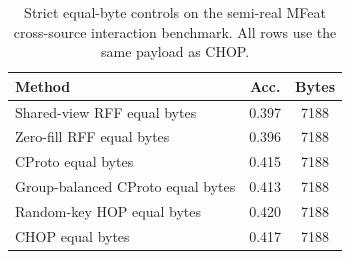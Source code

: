 \begin{table}[t]
\centering
\caption{Strict equal-byte controls on the semi-real MFeat cross-source interaction benchmark. All rows use the same payload as CHOP.}
\label{tab:strict-equal-byte-mfeat-interaction}
\begin{tabular}{lcc}
\toprule
Method & Acc. & Bytes \\
\midrule
Shared-view RFF equal bytes & 0.397 & 7188 \\
Zero-fill RFF equal bytes & 0.396 & 7188 \\
CProto equal bytes & 0.415 & 7188 \\
Group-balanced CProto equal bytes & 0.413 & 7188 \\
Random-key HOP equal bytes & 0.420 & 7188 \\
CHOP equal bytes & 0.417 & 7188 \\
\bottomrule
\end{tabular}
\end{table}
